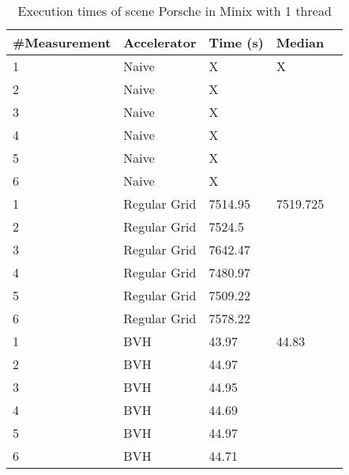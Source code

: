 \begin{table}[H]
	\small
	\begin{tabular}{|l|l|l|l|l|}
		\hline
		\#Measurement & Accelerator & Time (s) & Median \\ \hline
		1 & Naive & X & X \\ \hline
		2 & Naive & X & \\ \hline
		3 & Naive & X & \\ \hline
		4 & Naive & X & \\ \hline
		5 & Naive & X & \\ \hline
		6 & Naive & X & \\ \hline
		1 & Regular Grid & 7514.95 & 7519.725 \\ \hline
		2 & Regular Grid & 7524.5 & \\ \hline
		3 & Regular Grid & 7642.47 & \\ \hline
		4 & Regular Grid & 7480.97 & \\ \hline
		5 & Regular Grid & 7509.22 & \\ \hline
		6 & Regular Grid & 7578.22 & \\ \hline
		1 & BVH & 43.97 & 44.83 \\ \hline
		2 & BVH & 44.97 & \\ \hline
		3 & BVH & 44.95 & \\ \hline
		4 & BVH & 44.69 & \\ \hline
		5 & BVH & 44.97 & \\ \hline
		6 & BVH & 44.71 & \\ \hline
	\end{tabular}
	\label{Time}
	\caption{Execution times of scene Porsche in Minix with 1 thread}
\end{table}

